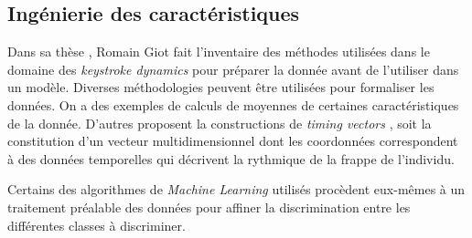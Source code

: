 \subsection{Ingénierie des caractéristiques}

Dans sa thèse \cite{giotThese}, Romain Giot fait l'inventaire des méthodes utilisées dans le domaine des \textit{keystroke dynamics} pour préparer la donnée avant de l'utiliser dans un modèle. Diverses méthodologies peuvent être utilisées pour formaliser les données. On a des exemples de calculs de moyennes de certaines caractéristiques de la donnée. D'autres proposent la constructions de \textit{timing vectors} \cite{killourhy2009}, soit la constitution d'un vecteur multidimensionnel dont les coordonnées correspondent à des données temporelles qui décrivent la rythmique de la frappe de l'individu.

Certains des algorithmes de \textit{Machine Learning} utilisés procèdent eux-mêmes à un traitement préalable des données pour affiner la discrimination entre les différentes classes à discriminer.